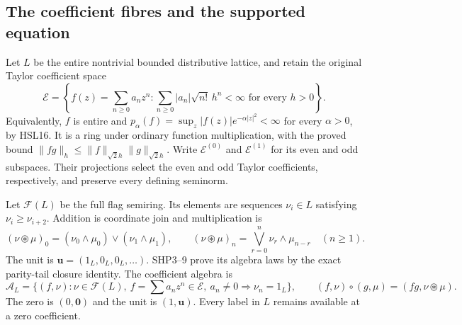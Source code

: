 \subsection{The coefficient fibres and the supported equation}

Let $L$ be the entire nontrivial bounded distributive lattice,
and retain the original Taylor coefficient space
\[
 \mathcal E=\left\{f(z)=\sum_{n\ge0}a_nz^n:
       \sum_{n\ge0}|a_n|\sqrt{n!}\,h^n<\infty
                         \text{ for every }h>0\right\}.
\]
Equivalently, $f$ is entire and
$p_\alpha(f)=\sup_z|f(z)|e^{-\alpha|z|^2}<\infty$ for
every $\alpha>0$, by HSL16. It is a ring under ordinary
function multiplication, with the proved bound
$\|fg\|_h\le\|f\|_{\sqrt2h}\|g\|_{\sqrt2h}$.
Write $\mathcal E^{(0)}$ and $\mathcal E^{(1)}$ for its
even and odd subspaces. Their projections select the even
and odd Taylor coefficients, respectively, and preserve
every defining seminorm.

Let $\mathcal F(L)$ be the full flag semiring. Its elements
are sequences $\nu_i\in L$ satisfying $\nu_i\ge\nu_{i+2}$.
Addition is coordinate join and multiplication is
\begin{equation}\tag{HFD1}
 (\nu\circledast\mu)_0
    =(\nu_0\wedge\mu_0)\vee(\nu_1\wedge\mu_1),\qquad
 (\nu\circledast\mu)_n
    =\bigvee_{r=0}^{n}\nu_r\wedge\mu_{n-r}\quad(n\ge1).
\end{equation}
The unit is $\mathbf u=(1_L,0_L,0_L,\ldots)$.
SHP3--9 prove its algebra laws by the exact
parity-tail closure identity. The coefficient algebra is
\begin{equation}\tag{HFD2}
 \mathcal A_L=\{(f,\nu):\nu\in\mathcal F(L),\
       f=\sum a_nz^n\in\mathcal E,\
       a_n\ne0\Longrightarrow\nu_n=1_L\},\qquad
 (f,\nu)\circ(g,\mu)=(fg,\nu\circledast\mu).
\end{equation}
The zero is $(0,\mathbf0)$ and the unit is $(1,\mathbf u)$.
Every label in $L$ remains available at a zero coefficient.

